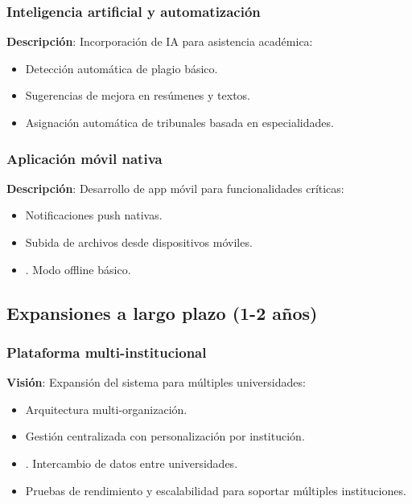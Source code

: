 \documentclass[12pt,a4paper,oneside]{report}
\providecommand{\tightlist}{%
  \setlength{\itemsep}{0pt}\setlength{\parskip}{0pt}}
\begin{document}
\subsubsection{Inteligencia artificial y
automatización}\label{inteligencia-artificial-y-automatizaciuxf3n}

\textbf{Descripción}: Incorporación de IA para asistencia académica: 

\begin{itemize}
\tightlist
\item
  Detección automática de plagio básico.
\item
  Sugerencias de mejora en resúmenes y textos.
\item
  Asignación automática de tribunales basada en especialidades.
\end{itemize}

\subsubsection{Aplicación móvil
nativa}\label{aplicaciuxf3n-muxf3vil-nativa}

\textbf{Descripción}: Desarrollo de app móvil para funcionalidades
críticas: 

\begin{itemize}
\tightlist
\item
  Notificaciones push nativas.
\item
  Subida de archivos desde dispositivos móviles.
\item.
  Modo offline básico.
\end{itemize}

\subsection{Expansiones a largo plazo (1-2
años)}\label{expansiones-a-largo-plazo-1-2-auxf1os}

\subsubsection{Plataforma
multi-institucional}\label{plataforma-multi-institucional}

\textbf{Visión}: Expansión del sistema para múltiples universidades:

\begin{itemize}
\tightlist
\item
  Arquitectura multi-organización.
\item
  Gestión centralizada con personalización por institución.
\item.
  Intercambio de datos entre universidades.
\item
  Pruebas de rendimiento y escalabilidad para soportar múltiples instituciones.
\end{itemize}
\end{document}
